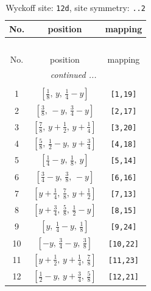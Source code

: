 \documentclass[fleqn,8pt]{jsarticle}
\begin{document}
\begin{longtable}{ccc}
\caption{Wyckoff site: {\tt 12d}, site symmetry: {\tt ..2}}
 \\
 \hline \hline
No. & position & mapping \\ \hline \endfirsthead

\multicolumn{2}{l}{\tablename\ \thetable{}} \\
 \hline \hline
No. & position & mapping \\ \hline \endhead

 \hline \hline
\multicolumn{2}{r}{\footnotesize\it continued ...} \\ \endfoot

 \hline \hline
\multicolumn{2}{r}{} \\ \endlastfoot

1 & $\left[ \frac{1}{8},\, y,\, \frac{1}{4} - y \right]$ & {\tt [1,19]} \\ \hline
2 & $\left[ \frac{3}{8},\, - y,\, \frac{3}{4} - y \right]$ & {\tt [2,17]} \\ \hline
3 & $\left[ \frac{7}{8},\, y + \frac{1}{2},\, y + \frac{1}{4} \right]$ & {\tt [3,20]} \\ \hline
4 & $\left[ \frac{5}{8},\, \frac{1}{2} - y,\, y + \frac{3}{4} \right]$ & {\tt [4,18]} \\ \hline
5 & $\left[ \frac{1}{4} - y,\, \frac{1}{8},\, y \right]$ & {\tt [5,14]} \\ \hline
6 & $\left[ \frac{3}{4} - y,\, \frac{3}{8},\, - y \right]$ & {\tt [6,16]} \\ \hline
7 & $\left[ y + \frac{1}{4},\, \frac{7}{8},\, y + \frac{1}{2} \right]$ & {\tt [7,13]} \\ \hline
8 & $\left[ y + \frac{3}{4},\, \frac{5}{8},\, \frac{1}{2} - y \right]$ & {\tt [8,15]} \\ \hline
9 & $\left[ y,\, \frac{1}{4} - y,\, \frac{1}{8} \right]$ & {\tt [9,24]} \\ \hline
10 & $\left[ - y,\, \frac{3}{4} - y,\, \frac{3}{8} \right]$ & {\tt [10,22]} \\ \hline
11 & $\left[ y + \frac{1}{2},\, y + \frac{1}{4},\, \frac{7}{8} \right]$ & {\tt [11,23]} \\ \hline
12 & $\left[ \frac{1}{2} - y,\, y + \frac{3}{4},\, \frac{5}{8} \right]$ & {\tt [12,21]} \\
\end{longtable}
\renewcommand{\arraystretch}{1.2}
\end{document}
